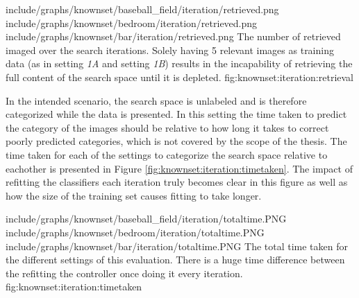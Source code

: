 \tripfigurenear
{include/graphs/knownset/baseball_field/iteration/retrieved.png}
{include/graphs/knownset/bedroom/iteration/retrieved.png}
{include/graphs/knownset/bar/iteration/retrieved.png}
{The number of retrieved imaged over the search iterations. Solely having 5 relevant images as training data (as in setting \emph{1A} and setting \emph{1B}) results in the incapability of retrieving the full content of the search space until it is depleted.}
{fig:knownset:iteration:retrieval}

In the intended scenario, the search space is unlabeled and is therefore categorized while the data is presented. In this setting the time taken to predict the category of the images should be relative to how long it takes to correct poorly predicted categories, which is not covered by the scope of the thesis. The time taken for each of the settings to categorize the search space relative to eachother is presented in Figure \ref{fig:knownset:iteration:timetaken}. The impact of refitting the classifiers each iteration truly becomes clear in this figure as well as how the size of the training set causes fitting to take longer. 

\tripfigure
{include/graphs/knownset/baseball_field/iteration/totaltime.PNG}
{include/graphs/knownset/bedroom/iteration/totaltime.PNG}
{include/graphs/knownset/bar/iteration/totaltime.PNG}
{The total time taken for the different settings of this evaluation. There is a huge time difference between the refitting the controller once doing it every iteration.}
{fig:knownset:iteration:timetaken}
